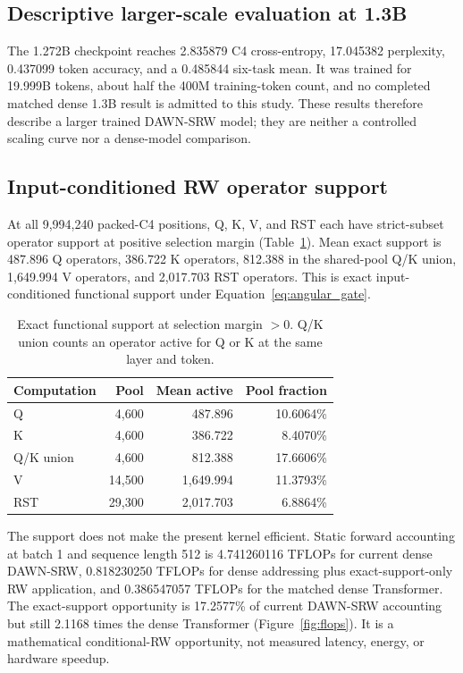 \documentclass{article}
\newcommand{\DAWN}{DAWN-SRW}
\begin{document}
\subsection{Descriptive larger-scale evaluation at 1.3B}

The 1.272B checkpoint reaches 2.835879 C4 cross-entropy, 17.045382
perplexity, 0.437099 token accuracy, and a 0.485844 six-task mean. It was
trained for 19.999B tokens, about half the 400M training-token count, and no
completed matched dense 1.3B result is admitted to this study. These results
therefore describe a larger trained \DAWN{} model; they are neither a
controlled scaling curve nor a dense-model comparison.

\subsection{Input-conditioned RW operator support}
\label{sec:support}

At all 9,994,240 packed-C4 positions, Q, K, V, and RST each have strict-subset
operator support at positive selection margin (Table~\ref{tab:support}). Mean exact support
is 487.896 Q operators, 386.722 K operators, 812.388 in the shared-pool Q/K
union, 1,649.994 V operators, and 2,017.703 RST operators. This is exact
input-conditioned functional support under Equation~\ref{eq:angular_gate}.

\begin{table}[t]
\centering
\caption{Exact functional support at selection margin \(>0\). Q/K union counts
an operator active for Q or K at the same layer and token.}
\label{tab:support}
\small
\begin{tabular}{lrrr}
\toprule
Computation & Pool & Mean active & Pool fraction\\
\midrule
Q & 4,600 & 487.896 & 10.6064\%\\
K & 4,600 & 386.722 & 8.4070\%\\
Q/K union & 4,600 & 812.388 & 17.6606\%\\
V & 14,500 & 1,649.994 & 11.3793\%\\
RST & 29,300 & 2,017.703 & 6.8864\%\\
\bottomrule
\end{tabular}
\end{table}

The support does not make the present kernel efficient. Static forward
accounting at batch 1 and sequence length 512 is 4.741260116 TFLOPs for
current dense \DAWN{}, 0.818230250 TFLOPs for dense addressing plus
exact-support-only RW application, and 0.386547057 TFLOPs for the matched
dense Transformer. The exact-support opportunity is 17.2577\% of current
\DAWN{} accounting but still 2.1168 times the dense Transformer
(Figure~\ref{fig:flops}). It is a mathematical conditional-RW opportunity,
not measured latency, energy, or hardware speedup.
\end{document}
